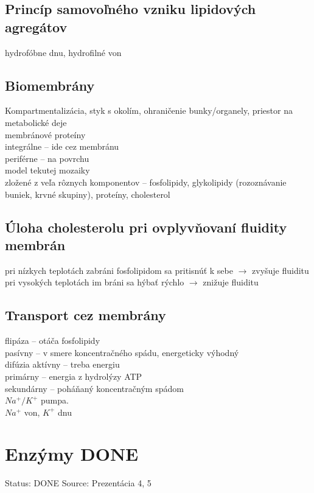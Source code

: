 \subsection*{Princíp samovoľného vzniku lipidových agregátov}
hydrofóbne dnu, hydrofilné von\\
\subsection*{Biomembrány}
Kompartmentalizácia, styk s okolím, ohraničenie bunky/organely, priestor na metabolické deje\\
membránové proteíny\\
\tab integrálne -- ide cez membránu\\
\tab periférne -- na povrchu\\
model tekutej mozaiky\\
\tab zložené z veľa rôznych komponentov -- fosfolipidy, glykolipidy (rozoznávanie buniek, krvné skupiny), proteíny, cholesterol\\
\subsection*{Úloha cholesterolu pri ovplyvňovaní fluidity membrán}
pri nízkych teplotách zabráni fosfolipidom sa pritisnúť k sebe $\rightarrow$ zvyšuje fluiditu\\
pri vysokých teplotách im bráni sa hýbať rýchlo $\rightarrow$ znižuje fluiditu\\
\subsection*{Transport cez membrány}
flipáza -- otáča fosfolipidy\\
pasívny -- v smere koncentračného spádu, energeticky výhodný\\
\tab difúzia
aktívny -- treba energiu\\
\tab primárny -- energia z hydrolýzy ATP\\
\tab sekundárny -- poháňaný koncentračným spádom\\
$Na^+/K^+$ pumpa.\\
\tab $Na^+$ von, $K^+$ dnu
\\
\section{Enzýmy DONE}

Status: DONE
Source: Prezentácia 4, 5

